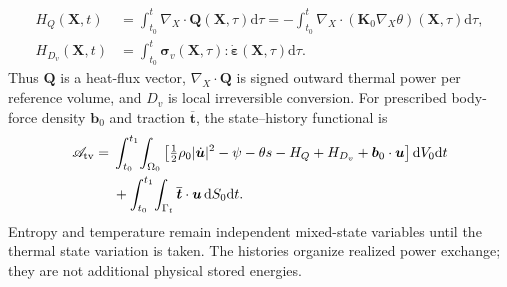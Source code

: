 \documentclass[11pt,a4paper]{article}
\theoremstyle{remark}\newtheorem{remark}{Remark}
\numberwithin{equation}{section}
\newcommand{\dd}{\mathrm{d}}
\newcommand{\XX}{\boldsymbol X}
\newcommand{\grad}{\nabla}
\begin{document}
\begin{equation}
\begin{aligned}
H_Q(\XX,t)&=\int_{t_0}^{t}\grad_X\!\cdot\boldsymbol Q(\XX,\tau)\dd\tau
=-\int_{t_0}^{t}\grad_X\!\cdot(\boldsymbol K_0\grad_X\theta)(\XX,\tau)\dd\tau,\\
H_{D_v}(\XX,t)&=\int_{t_0}^{t}
\boldsymbol\sigma_v(\XX,\tau):\dot{\boldsymbol\varepsilon}(\XX,\tau)\dd\tau.
\end{aligned}
\label{eq:reviewhistories}
\end{equation}
Thus $\boldsymbol Q$ is a heat-flux vector, $\grad_X\!\cdot\boldsymbol Q$ is signed outward thermal power per reference volume, and $D_v$ is local irreversible conversion. For prescribed body-force density $\boldsymbol b_0$ and traction $\overline{\boldsymbol t}$, the state--history functional is
\begin{equation}
\begin{aligned}
\mathscr A_{\rm tv}={}&\int_{t_0}^{t_1}\!\int_{\Omega_0}
\left[\tfrac12\rho_0|\dot{\boldsymbol u}|^2-\psi-\theta s
-H_Q+H_{D_v}+\boldsymbol b_0\cdot\boldsymbol u\right]\dd V_0\dd t\\
&+\int_{t_0}^{t_1}\!\int_{\Gamma_t}
\overline{\boldsymbol t}\cdot\boldsymbol u\,\dd S_0\dd t.
\end{aligned}
\label{eq:reviewaction}
\end{equation}
Entropy and temperature remain independent mixed-state variables until the thermal state variation is taken. The histories organize realized power exchange; they are not additional physical stored energies.
\end{document}
